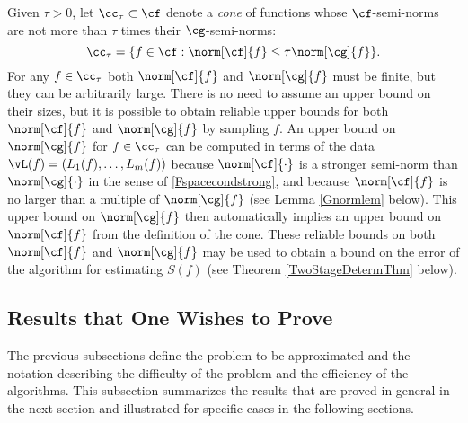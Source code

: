\documentclass[final]{elsarticle}
\theoremstyle{definition}
\theoremstyle{remark}
\begin{document}
Given $\tau>0$, let $\cc_{\tau} \subset \cf$ denote a \emph{cone} of functions whose $\cf$-semi-norms are not more than $\tau$ times their $\cg$-semi-norms:
\begin{equation} \label{conedef}
\cc_{\tau}=\{f \in \cf : \norm[\cf]{f} \le \tau \norm[\cg]{f} \}.
\end{equation}
For any $f \in \cc_{\tau}$ both $\norm[\cf]{f}$ and $\norm[\cg]{f}$ must be finite, but they can be arbitrarily large.  There is no need to assume an upper bound on their sizes, but it is possible to obtain reliable upper bounds for both $\norm[\cf]{f}$ and $\norm[\cg]{f}$ by sampling $f$.  An upper bound on $\norm[\cg]{f}$ for $f \in \cc_{\tau}$ can be computed in terms of the data $\vL(f)=(L_1(f), \ldots, L_m(f))$ because $\norm[\cf]{\cdot}$ is a stronger semi-norm than $\norm[\cg]{\cdot}$ in the sense of \eqref{Fspacecondstrong}, and because $\norm[\cf]{f}$ is no larger than a multiple of $\norm[\cg]{f}$ (see Lemma \ref{Gnormlem} below). This upper bound on $\norm[\cg]{f}$ then automatically implies an upper bound on $\norm[\cf]{f}$ from the definition of the cone. These reliable bounds on both $\norm[\cf]{f}$ and $\norm[\cg]{f}$ may be used to obtain a bound on the error of the algorithm for estimating $S(f)$  (see Theorem \ref{TwoStageDetermThm} below).

\subsection{Results that One Wishes to Prove}  The previous subsections define the problem to be approximated and the notation describing the difficulty of the problem and the efficiency of the algorithms.  This subsection summarizes the results that are proved in general in the next section and illustrated for specific cases in the following sections.
\end{document}
